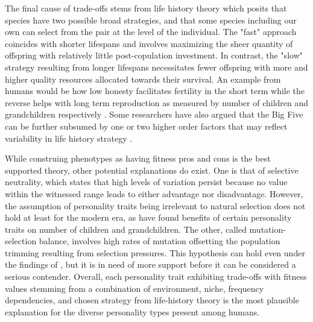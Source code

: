 \documentclass[a4paper, 12pt]{article}
\begin{document}
The final cause of trade-offs stems from life history theory which posits that species have two possible broad strategies, and that some species including our own can select from the pair at the level of the individual. The "fast" approach coincides with shorter lifespans and involves maximizing the sheer quantity of offspring with relatively little post-copulation investment. In contrast, the "slow" strategy resulting from longer lifespans necessitates fewer offspring with more and higher quality resources allocated towards their survival. An example from humans would be how low honesty facilitates fertility in the short term while the reverse helps with long term reproduction as measured by number of children and grandchildren respectively \cite{personalityFitness2018}. Some researchers have also argued that the Big Five can be further subsumed by one or two higher order factors that may reflect variability in life history strategy \cite{bigOne2007, bigTwo2006}. \par

While construing phenotypes as having fitness pros and cons is the best supported theory, other potential explanations do exist. One is that of selective neutrality, which states that high levels of variation persist because no value within the witnessed range leads to either advantage nor disadvantage\cite{hexaco2016}. However, the assumption of personality traits being irrelevant to natural selection does not hold at least for the modern era, as  have found benefits of certain personality traits on number of children and grandchildren. The other, called mutation-selection balance, involves high rates of mutation offsetting the population trimming resulting from selection pressures\cite{hexaco2016}. This hypothesis can hold even under the findings of \citeauthor{personalityFitness2018}, but it is in need of more support before it can be considered a serious contender. Overall, each personality trait exhibiting trade-offs with fitness values stemming from a combination of environment, niche, frequency dependencies, and chosen strategy from life-history theory is the most plausible explanation for the diverse personality types present among humans. 


\newpage


\end{document}
